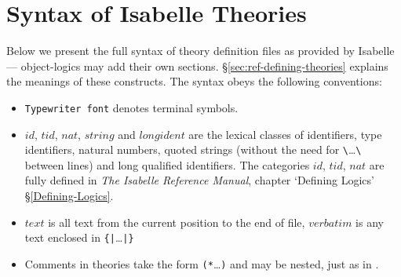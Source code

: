 
\appendix
{}  %

\chapter{Syntax of Isabelle Theories}\label{app:TheorySyntax}

Below we present the full syntax of theory definition files as
provided by {\Pure} Isabelle --- object-logics may add their own
sections.  \S\ref{sec:ref-defining-theories} explains the meanings of
these constructs.  The syntax obeys the following conventions:
\begin{itemize}
\item {\tt Typewriter font} denotes terminal symbols.
  
\item $id$, $tid$, $nat$, $string$ and $longident$ are the lexical
  classes of identifiers, type identifiers, natural numbers, quoted
  strings (without the need for \verb$\$\dots\verb$\$ between lines)
  and long qualified \ML{} identifiers.
  The categories $id$, $tid$, $nat$ are fully defined in %
  {{\it The Isabelle Reference Manual}, chapter `Defining Logics'}%
  {\S\ref{Defining-Logics}}.
  
\item $text$ is all text from the current position to the end of file,
  $verbatim$ is any text enclosed in \verb.{|.\dots\verb.|}.
  
\item Comments in theories take the form {\tt (*}\dots{\tt*)} and may
  be nested, just as in \ML.
\end{itemize}

